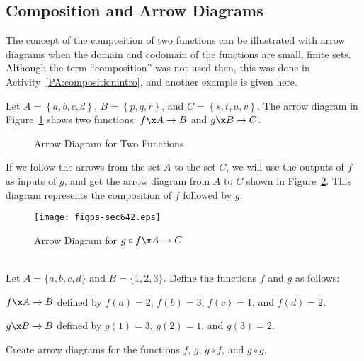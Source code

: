 
\subsection*{Composition and Arrow Diagrams} 
The concept of the composition of two functions can be illustrated with arrow diagrams when the domain and codomain of the functions are small, finite sets.  Although the term ``composition'' was not used then, this was done in \typeu Activity~\ref*{PA:compositionintro}, and another example is given here.

Let  $A = \left\{ {a, b, c, d} \right\}$, $B = \left\{ {p, q, r} \right\}$, and  
$C = \left\{ {s, t, u, v} \right\}$.  The arrow diagram in Figure~\ref{fig:arrow64-1} shows two functions:  
$f\x A \to B$  and  $g\x B \to C$.
\begin{figure}[h]
\begin{center}
\caption{Arrow Diagram for Two Functions} \label{fig:arrow64-1}
\end{center}
\end{figure}

If we follow the arrows from the set  $A$  to the set  $C$, we will use the outputs of  $f$  as inputs of  $g$, and get the arrow diagram from  $A$  to  $C$ shown in Figure~\ref{fig:arrow64-2}.  This diagram represents the composition of  $f$  followed by  $g$.
\begin{figure}[h]
\begin{center}
\texttt{[image: figps-sec642.eps]} 
\caption{Arrow Diagram for $g \circ f\x  A \to C$} \label{fig:arrow64-2}
\end{center}
\end{figure}
%
%


\begin{prog} \label{pr:compose} \hfill \\
Let $A = \{ a, b, c, d \}$ and $B = \{ 1, 2, 3 \}$.  Define the functions $f$ and $g$ as follows:
\begin{list}{}
\item $f \x A \to B$ defined by $f(a) = 2$, $f(b) = 3$, $f(c) = 1$, and $f(d) = 2$.
\item $g \x B \to B$ defined by $g(1) = 3$, $g(2) = 1$, and $g(3) = 2$.
\end{list}

\newpar
Create arrow diagrams for the functions $f$, $g$, $g \circ f$, and $g \circ g$.
\end{prog}
\hbreak



\endinput
